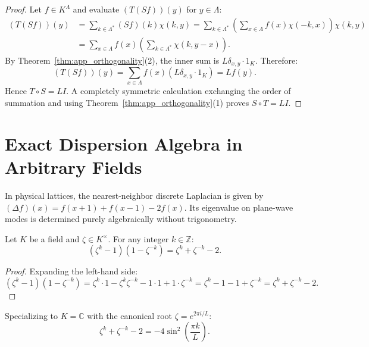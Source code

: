 \begin{proof}
Let $f \in K^\Lambda$ and evaluate $(T(Sf))(y)$ for $y \in \Lambda$:
\begin{align*}
(T(Sf))(y) &= \sum_{k \in \Lambda^*} (Sf)(k) \chi(k, y) = \sum_{k \in \Lambda^*} \left( \sum_{x \in \Lambda} f(x) \chi(-k, x) \right) \chi(k, y) \\
&= \sum_{x \in \Lambda} f(x) \left( \sum_{k \in \Lambda^*} \chi(k, y - x) \right).
\end{align*}
By Theorem~\ref{thm:app_orthogonality}(2), the inner sum is $L \delta_{x, y} \cdot 1_K$.
Therefore:
\[
(T(Sf))(y) = \sum_{x \in \Lambda} f(x) (L \delta_{x, y} \cdot 1_K) = L f(y).
\]
Hence $T \circ S = L I$. A completely symmetric calculation exchanging the order of summation and using Theorem~\ref{thm:app_orthogonality}(1) proves $S \circ T = L I$.
\end{proof}

\section{Exact Dispersion Algebra in Arbitrary Fields}

In physical lattices, the nearest-neighbor discrete Laplacian is given by $(\Delta f)(x) = f(x+1) + f(x-1) - 2 f(x)$.
Its eigenvalue on plane-wave modes is determined purely algebraically without trigonometry.

\begin{lemma}
\label{lem:laplacian_algebraic}
Let $K$ be a field and $\zeta \in K^\times$. For any integer $k \in \mathbb{Z}$:
\begin{equation}
(\zeta^k - 1)(1 - \zeta^{-k}) = \zeta^k + \zeta^{-k} - 2.
\end{equation}
\end{lemma}

\begin{proof}
Expanding the left-hand side:
\[
(\zeta^k - 1)(1 - \zeta^{-k}) = \zeta^k \cdot 1 - \zeta^k \zeta^{-k} - 1 \cdot 1 + 1 \cdot \zeta^{-k} = \zeta^k - 1 - 1 + \zeta^{-k} = \zeta^k + \zeta^{-k} - 2.
\]
\end{proof}

\begin{proposition}
Specializing to $K = \mathbb{C}$ with the canonical root $\zeta = e^{2\pi i / L}$:
\begin{equation}
\zeta^k + \zeta^{-k} - 2 = - 4 \sin^2\left(\frac{\pi k}{L}\right).
\end{equation}
\end{proposition}

